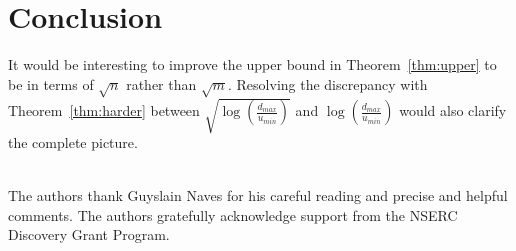 \documentclass[12pt]{article}
\begin{document}
\section{Conclusion}
It would be interesting to improve the upper bound in Theorem~\ref{thm:upper} to be in terms of $\sqrt{n}$
 rather than $\sqrt{m}$.
Resolving the discrepancy with Theorem~\ref{thm:harder}
between $\sqrt{\log(\frac{d_{max}}{u_{min}})}$ and $\log(\frac{d_{max}}{u_{min}})$ would also
clarify the complete picture.

\ \\
The authors thank Guyslain Naves for his careful reading and precise and helpful comments.
The authors gratefully acknowledge support from the NSERC Discovery Grant Program. 


\end{document}
